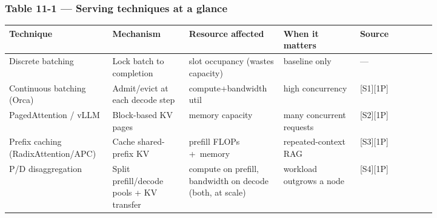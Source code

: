 
\subsubsection{Table 11-1 --- Serving techniques at a
glance}\label{table-11-1-serving-techniques-at-a-glance}

\nopagebreak[4]
\begin{longtable}[]{@{}
  >{\raggedright\arraybackslash}p{0.1647\linewidth}
  >{\raggedright\arraybackslash}p{0.1647\linewidth}
  >{\raggedright\arraybackslash}p{0.1647\linewidth}
  >{\raggedright\arraybackslash}p{0.1647\linewidth}
  >{\raggedright\arraybackslash}p{0.1647\linewidth}@{}}
\toprule\noalign{}
\begin{minipage}[b]{\linewidth}\raggedright
Technique
\end{minipage} & \begin{minipage}[b]{\linewidth}\raggedright
Mechanism
\end{minipage} & \begin{minipage}[b]{\linewidth}\raggedright
Resource affected
\end{minipage} & \begin{minipage}[b]{\linewidth}\raggedright
When it matters
\end{minipage} & \begin{minipage}[b]{\linewidth}\raggedright
Source
\end{minipage} \\
\midrule\noalign{}
\endhead
\bottomrule\noalign{}
\endlastfoot
Discrete batching & Lock batch to completion & slot occupancy (wastes
capacity) & baseline only & --- \\
\noalign{\label{tab:11.1}}
Continuous batching (Orca) & Admit/evict at each decode step &
compute+bandwidth util & high concurrency & \mbox{{[}S1{]}}\hspace{0pt}\mbox{{[}1P{]}} \\
PagedAttention / vLLM & Block-based KV pages & memory capacity & many
concurrent requests & \mbox{{[}S2{]}}\hspace{0pt}\mbox{{[}1P{]}} \\
Prefix caching (RadixAttention/APC) & Cache shared-prefix KV & prefill
FLOPs +~memory & repeated-context RAG & \mbox{{[}S3{]}}\hspace{0pt}\mbox{{[}1P{]}} \\
P/D disaggregation & Split prefill/decode pools + KV transfer & compute
on prefill, bandwidth on decode (both, at scale) & workload outgrows a
node & \mbox{{[}S4{]}}\hspace{0pt}\mbox{{[}1P{]}} \\
\end{longtable}

